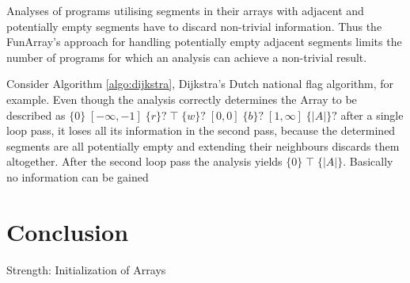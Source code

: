 \documentclass{report}
\newcommand{\bound}[1]{\{#1\}}
\newcommand{\fvalue}[1]{\;#1\;}
\begin{document}
 Analyses of programs utilising segments in their arrays with adjacent and potentially empty segments have to discard non-trivial information. Thus the FunArray's approach for handling potentially empty adjacent segments limits the number of programs for which an analysis can achieve a non-trivial result.
 
 Consider Algorithm \ref{algo:dijkstra}, Dijkstra's Dutch national flag algorithm, for example. Even though the analysis correctly determines the Array to be described as $\bound{0} \fvalue{[-\infty, -1]} \bound{r}? \fvalue{\top} \bound{w}? \fvalue{[0, 0]} \bound{b}? \fvalue{[1, \infty]}  \bound{|A|}?$ after a single loop pass, it loses all its information in the second pass, because the determined segments are all potentially empty and extending their neighbours discards them altogether. After the second loop pass the analysis yields $\bound{0} \fvalue{\top} \bound{|A|}$. Basically no information can be gained   
 



\chapter{Conclusion}

Strength: Initialization of Arrays




\newpage


\end{document}
